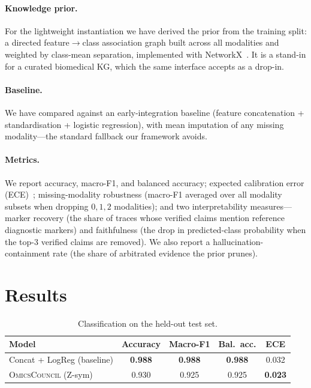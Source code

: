 \documentclass[runningheads]{llncs}
\newcommand{\tbd}{\textcolor{gray}{--}}
\begin{document}
\paragraph{Knowledge prior.}
For the lightweight instantiation we have derived the prior from the training split: a directed feature$\rightarrow$class association graph built across all modalities and weighted by class-mean separation, implemented with NetworkX~\cite{hagberg2008networkx}. It is a stand-in for a curated biomedical KG, which the same interface accepts as a drop-in.

\paragraph{Baseline.}
We have compared against an early-integration baseline (feature concatenation + standardisation + logistic regression), with mean imputation of any missing modality---the standard fallback our framework avoids.

\paragraph{Metrics.}
We report accuracy, macro-F1, and balanced accuracy; expected calibration error (ECE)~\cite{guo2017calibration}; missing-modality robustness (macro-F1 averaged over all modality subsets when dropping $0,1,2$ modalities); and two interpretability measures---marker recovery (the share of traces whose verified claims mention reference diagnostic markers) and faithfulness (the drop in predicted-class probability when the top-3 verified claims are removed). We also report a hallucination-containment rate (the share of arbitrated evidence the prior prunes).


\section{Results}
\begin{table}[t]
\centering
\caption{Classification on the held-out test set.}
\label{tab:cls}
\begin{tabular}{lcccc}
\toprule
Model & Accuracy & Macro-F1 & Bal.\ acc. & ECE \\
\midrule
Concat + LogReg (baseline) & \textbf{0.988} & \textbf{0.988} & \textbf{0.988} & 0.032 \\
\textsc{OmicsCouncil} (Z-sym) & 0.930 & 0.925 & 0.925 & \textbf{0.023} \\
\bottomrule
\end{tabular}
\end{table}
\end{document}
